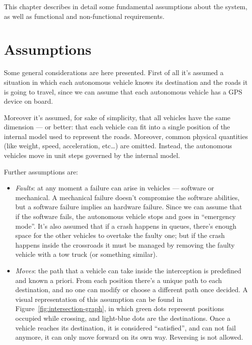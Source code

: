 \documentclass{memoir}
\begin{document}
This chapter describes in detail some fundamental assumptions about the system, as well as functional and non-functional requirements.

\section{Assumptions}

Some general considerations are here presented. First of all it's assumed a situation in which each autonomous vehicle knows its destination and the roads it is going to travel, since we can assume that each autonomous vehicle has a GPS device on board.

Moreover it's assumed, for sake of simplicity, that all vehicles have the same dimension --- or better: that each vehicle can fit into a single position of the internal model used to represent the roads. Moreover, common physical quantities (like weight, speed, acceleration, etc\dots) are omitted. Instead, the autonomous vehicles move in unit steps governed by the internal model.
\newline

Further assumptions are:

\begin{itemize}
	\item \emph{Faults}: at any moment a failure can arise in vehicles --- software or mechanical. A mechanical failure doesn't compromise the software abilities, but a software failure implies an hardware failure. Since we can assume that if the software fails, the autonomous vehicle stops and goes in ``emergency mode''. It's also assumed that if a crash happens in queues, there's enough space for the other vehicles to overtake the faulty one; but if the crash happens inside the crossroads it must be managed by removing the faulty vehicle with a tow truck (or something similar).
	\item \emph{Moves}: the path that a vehicle can take inside the interception is predefined and known a priori. From each position there's a unique path to each destination, and no one can modify or choose a different path once decided. A visual representation of this assumption can be found in Figure~\ref{fig:intersection-graph}, in which green dots represent positions occupied while crossing, and light-blue dots are the destinations. Once a vehicle reaches its destination, it is considered ``satisfied'', and can not fail anymore, it can only move forward on its own way. Reversing is not allowed.
\end{itemize}
\end{document}
